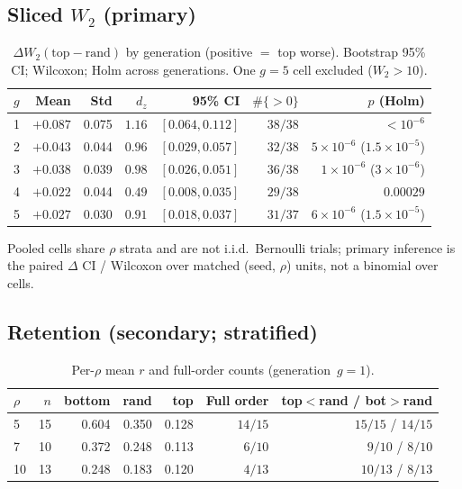 \documentclass[11pt]{article}
\begin{document}
\subsection{Sliced $W_2$ (primary)}
\begin{table}[t]
\centering
\caption{$\Delta W_2(\mathrm{top}-\mathrm{rand})$ by generation (positive $=$ top worse). Bootstrap 95\% CI; Wilcoxon; Holm across generations. One $g{=}5$ cell excluded ($W_2{>}10$).}
\label{tab:w2}
\begin{tabular}{lrrrrrr}
\toprule
$g$ & Mean & Std & $d_z$ & 95\% CI & $\#\{>0\}$ & $p$ (Holm) \\
\midrule
1 & $+0.087$ & 0.075 & $1.16$ & $[0.064,0.112]$ & $38/38$ & ${<}10^{-6}$ \\
2 & $+0.043$ & 0.044 & $0.96$ & $[0.029,0.057]$ & $32/38$ & $5{\times}10^{-6}$ ($1.5{\times}10^{-5}$) \\
3 & $+0.038$ & 0.039 & $0.98$ & $[0.026,0.051]$ & $36/38$ & $1{\times}10^{-6}$ ($3{\times}10^{-6}$) \\
4 & $+0.022$ & 0.044 & $0.49$ & $[0.008,0.035]$ & $29/38$ & $0.00029$ \\
5 & $+0.027$ & 0.030 & $0.91$ & $[0.018,0.037]$ & $31/37$ & $6{\times}10^{-6}$ ($1.5{\times}10^{-5}$) \\
\bottomrule
\end{tabular}
\end{table}

Pooled cells share $\rho$ strata and are not i.i.d.\ Bernoulli trials; primary inference is the paired $\Delta$ CI / Wilcoxon over matched (seed, $\rho$) units, not a binomial over cells.

\subsection{Retention (secondary; stratified)}
\label{sec:ret}
\begin{table}[t]
\centering
\caption{Per-$\rho$ mean $r$ and full-order counts (generation~$g{=}1$).}
\label{tab:byrho}
\begin{tabular}{lrrrrrr}
\toprule
$\rho$ & $n$ & bottom & rand & top & Full order & top$<$rand / bot$>$rand \\
\midrule
5 & 15 & 0.604 & 0.350 & 0.128 & $14/15$ & $15/15$ / $14/15$ \\
7 & 10 & 0.372 & 0.248 & 0.113 & $6/10$ & $9/10$ / $8/10$ \\
10 & 13 & 0.248 & 0.183 & 0.120 & $4/13$ & $10/13$ / $8/13$ \\
\bottomrule
\end{tabular}
\end{table}
\end{document}
